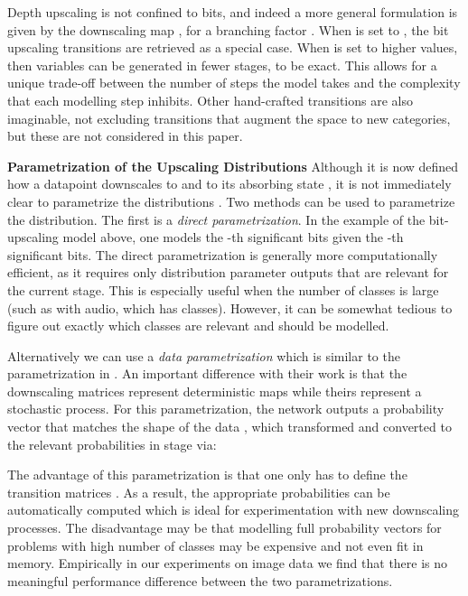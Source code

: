 \documentclass{article} \usepackage{iclr2022_conference,times}
\begin{document}
Depth upscaling is not confined to bits, and indeed a more general formulation is given by the downscaling map , for a branching factor . When  is set to , the bit upscaling transitions are retrieved as a special case. When  is set to higher values, then variables can be generated in fewer stages,  to be exact. This allows for a unique trade-off between the number of steps the model takes and the complexity that each modelling step inhibits. Other hand-crafted transitions are also imaginable, not excluding transitions that augment the space to new categories, but these are not considered in this paper.

\textbf{Parametrization of the Upscaling Distributions} \hspace{.2cm}
Although it is now defined how a datapoint  downscales to  and to its absorbing state , it is not immediately clear to parametrize the distributions . Two methods can be used to parametrize the distribution. The first is a \textit{direct parametrization}. In the example of the bit-upscaling model above, one models the -th significant bits given the -th significant bits. The direct parametrization is generally more computationally efficient, as it requires only distribution parameter outputs that are relevant for the current stage. This is especially useful when the number of classes is large (such as with audio, which has  classes). However, it can be somewhat tedious to figure out exactly which classes are relevant and should be modelled.

Alternatively we can use a \textit{data parametrization} which is similar to the parametrization in \citet{austin2021structured}. An important difference with their work is that the downscaling matrices  represent deterministic maps while theirs represent a stochastic process. For this parametrization, the network  outputs a probability vector  that matches the shape of the data , which transformed and converted to the relevant probabilities in stage  via:

The advantage of this parametrization is that one only has to define the transition matrices . As a result, the appropriate probabilities can be automatically computed which is ideal for experimentation with new downscaling processes. The disadvantage may be that modelling full probability vectors for problems with high number of classes may be expensive and not even fit in memory. Empirically in our experiments on image data we find that there is no meaningful performance difference between the two parametrizations.
 
\end{document}
